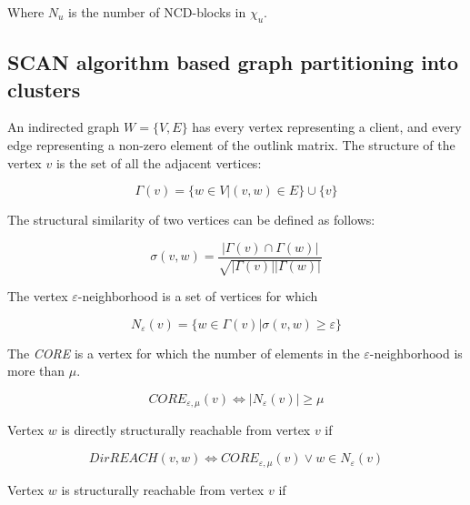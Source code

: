 \documentclass[a4paper,12pt]{article}
\begin{document}
Where $N_u$ is the number of NCD-blocks in $\chi_u$.


\subsection{SCAN algorithm based graph partitioning into clusters}

An indirected graph $W = \{V, E\}$ has every vertex representing a client, and every edge representing a non-zero element of the outlink matrix. The structure of the vertex $v$ is the set of all the adjacent vertices:


$$
\Gamma(v)=\{w \in V|(v,w) \in E\} \cup \{v\}
$$

The structural similarity of two vertices can be defined as follows:


$$
\sigma(v,w)=\frac{ |\Gamma(v) \cap \Gamma(w)|}{\sqrt{|\Gamma(v)||\Gamma(w)|}}
$$

The vertex $\varepsilon$-neighborhood is a set of vertices for which


$$
N_{\varepsilon}(v) = \{ w \in \Gamma(v) | \sigma(v,w) \ge \varepsilon \}
$$

The \textit{CORE} is a vertex for which the number of elements in the $\varepsilon$-neighborhood is more than $\mu$.


$$
CORE_{\varepsilon,\mu}(v) \Leftrightarrow |N_{\varepsilon} (v)| \ge \mu
$$

Vertex $w$ is directly structurally reachable from vertex $v$ if


$$
DirREACH(v,w) \Leftrightarrow CORE_{\varepsilon,\mu}(v) \vee w \in N_{\varepsilon}(v)
$$

Vertex $w$ is structurally reachable from vertex $v$ if
\end{document}
